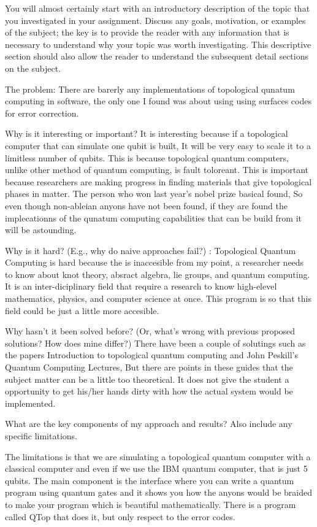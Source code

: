 \documentclass{article}
\begin{document}
You will almost certainly start with an introductory description of the topic that you investigated in your assignment.  Discuss any goals, motivation, or examples of the subject; the key is to provide the reader with any information that is necessary to understand why your topic was worth investigating.  This descriptive section should also allow the reader to understand the subsequent detail sections on the subject.

The problem: There are barerly any implementations of topological qunatum computing in software, the only one I found was about using using surfaces codes for error correction.

Why is it interesting or important? It is interesting because if a topological computer that can simulate one qubit is built, It will be very easy to scale it to a limitless number of qubits. This is because topological quantum computers, unlike other method of quantum computing, is fault toloreant. This is important because researchers are making progress in finding materials that give topological phases in matter. The person who won last year's nobel prize basical found, So even though non-ableian anyons have not been found, if they are found the implecationns of the qunatum computing capabilities that can be build from it will be astounding.

Why is it hard? (E.g., why do naive approaches fail?) : Topological Quantum Computing is hard because the  is inaccesible from my point, a researcher needs to know about knot theory, absract algebra, lie groups, and quantum computing. It is an inter-diciplinary field that require a research to know high-elevel mathematics, physics, and computer science at once. This program is so that this field could be just a little more accesible.

Why hasn't it been solved before? (Or, what's wrong with previous proposed solutions? How does mine differ?)
There have been a couple of solutings such as the papers Introduction to topological quantum computing and John Peskill's Quantum Computing Lectures, But there are points in these guides that the subject matter can be a little too theoretical. It does not give the student a opportunity to get his/her hands dirty with how the actual system would be implemented.

What are the key components of my approach and results? Also include any specific limitations.

The limitations is that we are simulating a topological quantum computer with a classical computer and even if we use the IBM quantum computer, that is just 5 qubits. The main component is the interface where you can write a quantum program using quantum gates and it shows you how the anyons would be braided to make your program which is beautiful mathematically. There is a program called QTop that does it, but only respect to the error codes.
\end{document}
